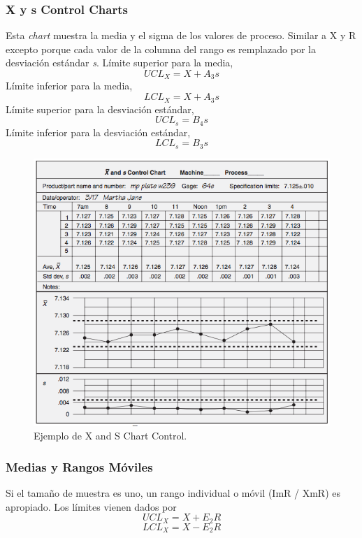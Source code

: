 \documentclass[]{article}
\begin{document}
\subsubsection{X y s Control Charts}

Esta \textit{chart} muestra la media y el sigma de los valores de proceso. Similar a X y R excepto porque cada valor de la columna del rango es remplazado por la desviación estándar \textit{s}.
 Límite superior para la media,
 \begin{equation}
 UCL_X = X + A_3s
 \end{equation}
 Límite inferior para la media,
 \begin{equation}
 LCL_X = X + A_3s
 \end{equation}
 Límite superior para la desviación estándar,
 \begin{equation}
 UCL_s = B_4s
 \end{equation}
 Límite inferior  para la desviación estándar,
 \begin{equation}
 LCL_s = B_3s
 \end{equation}

\begin{figure}[H]
	\centering
	\includegraphics[width=120mm]{imagenes/XandsControlEjemplo.png}
	\caption{Ejemplo de X and S Chart Control.}
	\label{fig:XandSControlEjemplo}
\end{figure}

\subsubsection{Medias y Rangos Móviles}
Si el tamaño de muestra es uno, un rango individual o móvil (ImR / XmR) es apropiado. Los límites vienen dados por
\begin{equation}
UCL_X = X + E_2R
\end{equation}
\begin{equation}
LCL_X = X - E_2R
\end{equation}
\end{document}
